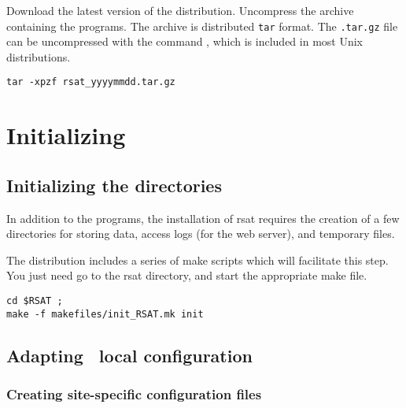 \documentclass[12pt,a4paper, oneside]{scrreprt} %
\begin{document}
Download the latest version of the \RSAT distribution. Uncompress the
archive containing the programs. The archive is distributed
\texttt{tar} format. The \texttt{.tar.gz} file can be uncompressed
with the command , which is included in most Unix
distributions.

\begin{lstlisting}
tar -xpzf rsat_yyyymmdd.tar.gz
\end{lstlisting}


\chapter{Initializing \RSAT}




\section{Initializing the directories}

In addition to the programs, the installation of rsat requires
the creation of a few directories for storing data, access logs (for
the web server), and temporary files.

The distribution includes a series of make scripts which will
facilitate this step. You just need go to the rsat directory, and
start the appropriate make file.

\begin{lstlisting}
cd $RSAT ; 
make -f makefiles/init_RSAT.mk init
\end{lstlisting}

\section{Adapting \RSAT \  local configuration}


\subsection{Creating site-specific configuration files}
\end{document}
